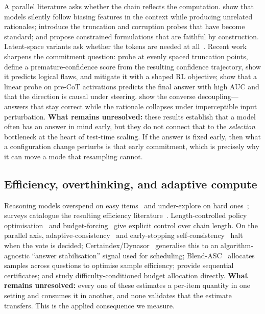 A parallel literature asks whether the chain reflects the computation.
\citet{turpin2023unfaithful} show that models silently follow biasing features
in the context while producing unrelated rationales;
\citet{lanham2023measuring} introduce the truncation and corruption probes that
have become standard; and \citet{lyu2023faithful} propose constrained
formulations that are faithful by construction. Latent-space variants ask
whether the tokens are needed at
all~\citep{hao2024coconut,pfau2024filler,goyal2024pause}. Recent work sharpens
the commitment question: \citet{prematureconfidence2026} probe at evenly spaced
truncation points, define a premature-confidence score from the resulting
confidence trajectory, show it predicts logical flaws, and mitigate it with a
shaped RL objective; \citet{precotprobe2026} show that a linear probe on
pre-CoT activations predicts the final answer with high AUC and that the
direction is causal under steering. \citet{matcha2025} show the converse
decoupling---answers that stay correct while the rationale collapses under
imperceptible input perturbation. \textbf{What remains unresolved:} these
results establish that a model often has an answer in mind early, but they do
not connect that to the \emph{selection} bottleneck at the heart of test-time
scaling. If the answer is fixed early, then what a configuration change
perturbs is that early commitment, which is precisely why it can move a mode
that resampling cannot.

\subsection{Efficiency, overthinking, and adaptive compute}

Reasoning models overspend on easy items~\citep{overthinking2024} and
under-explore on hard ones~\citep{underthinking2025}; surveys catalogue the
resulting efficiency
literature~\citep{stopoverthinking2025}. Length-controlled policy
optimisation~\citep{l1_2025} and budget-forcing~\citep{muennighoff2025s1} give
explicit control over chain length. On the parallel axis,
adaptive-consistency~\citep{aggarwal2023adaptive} and early-stopping
self-consistency~\citep{li2024esc} halt when the vote is decided;
Certaindex/Dynasor~\citep{fu2024certaindex} generalise this to an
algorithm-agnostic ``answer stabilisation'' signal used for scheduling;
Blend-ASC~\citep{blendasc2025} allocates samples across questions to optimise
sample efficiency; \citet{certifiedsc2025} provide sequential certificates; and
\citet{adaptivettc2026} study difficulty-conditioned budget allocation directly.
\textbf{What remains unresolved:} every one of these estimates a per-item
quantity in one setting and consumes it in another, and none validates that the
estimate transfers. This is the applied consequence we measure.

